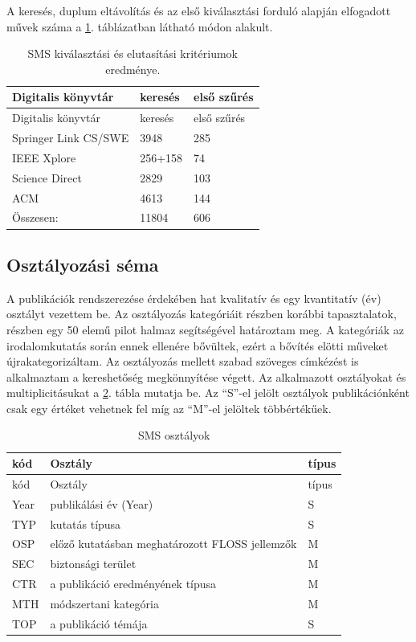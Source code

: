 \documentclass[12pt,magyar,a4paper,oneside]{scrreprt}
\begin{document}
A keresés, duplum eltávolítás és az első kiválasztási forduló alapján
elfogadott művek száma a \ref{tbl:SMSPubNum}. táblázatban látható módon
alakult.

\hypertarget{tbl:SMSPubNum}{}
\begin{longtable}[]{@{}lll@{}}
\caption{\label{tbl:SMSPubNum}SMS kiválasztási és elutasítási
kritériumok eredménye.}\tabularnewline
\toprule
Digitalis könyvtár & keresés & első szűrés\tabularnewline
\midrule
\endfirsthead
\toprule
Digitalis könyvtár & keresés & első szűrés\tabularnewline
\midrule
\endhead
Springer Link CS/SWE & 3948 & 285\tabularnewline
IEEE Xplore & 256+158 & 74\tabularnewline
Science Direct & 2829 & 103\tabularnewline
ACM & 4613 & 144\tabularnewline
Összesen: & 11804 & 606\tabularnewline
\bottomrule
\end{longtable}

\hypertarget{osztuxe1lyozuxe1si-suxe9ma}{%
\subsection{Osztályozási séma}\label{osztuxe1lyozuxe1si-suxe9ma}}

A publikációk rendszerezése érdekében hat kvalitatív és egy kvantitatív
(év) osztályt vezettem be. Az osztályozás kategóriáit részben korábbi
tapasztalatok, részben egy 50 elemű pilot halmaz segítségével határoztam
meg. A kategóriák az irodalomkutatás során ennek ellenére bővültek,
ezért a bővítés elötti műveket újrakategorizáltam. Az osztályozás
mellett szabad szöveges címkézést is alkalmaztam a kereshetőség
megkönnyítése végett. Az alkalmazott osztályokat és multiplicitásukat a
\ref{tbl:SMSClass}. tábla mutatja be. Az ``S''-el jelölt osztályok
publikációnként csak egy értéket vehetnek fel míg az ``M''-el jelöltek
többértékűek.

\hypertarget{tbl:SMSClass}{}
\begin{longtable}[]{@{}lll@{}}
\caption{\label{tbl:SMSClass}SMS osztályok}\tabularnewline
\toprule
kód & Osztály & típus\tabularnewline
\midrule
\endfirsthead
\toprule
kód & Osztály & típus\tabularnewline
\midrule
\endhead
Year & publikálási év (Year) & S\tabularnewline
TYP & kutatás típusa & S\tabularnewline
OSP & előző kutatásban meghatározott FLOSS jellemzők & M\tabularnewline
SEC & biztonsági terület & M\tabularnewline
CTR & a publikáció eredményének típusa & M\tabularnewline
MTH & módszertani kategória & M\tabularnewline
TOP & a publikáció témája & S\tabularnewline
\bottomrule
\end{longtable}
\end{document}
